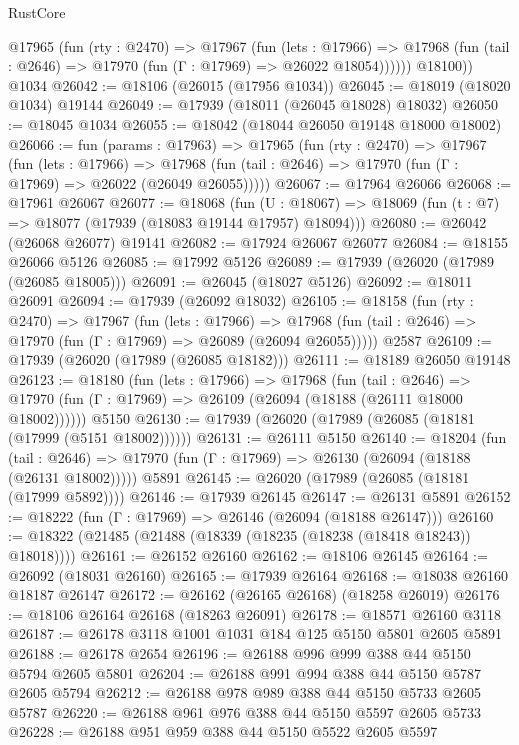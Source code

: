 \begin{lexlean}{RustCore}
\begin{coremodule}
          @17965
            (fun (rty : @2470) =>
            @17967
              (fun (lets : @17966) =>
              @17968 (fun (tail : @2646) => @17970 (fun (Γ : @17969) => @26022 @18054))))))
        @18100))
    @1034
@26042 := @18106 (@26015 (@17956 @1034))
@26045 := @18019 (@18020 @1034) @19144
@26049 := @17939 (@18011 (@26045 @18028) @18032)
@26050 := @18045 @1034
@26055 := @18042 (@18044 @26050 @19148 @18000 @18002)
@26066 := fun (params : @17963) =>
  @17965
    (fun (rty : @2470) =>
    @17967
      (fun (lets : @17966) =>
      @17968 (fun (tail : @2646) => @17970 (fun (Γ : @17969) => @26022 (@26049 @26055)))))
@26067 := @17964 @26066
@26068 := @17961 @26067
@26077 := @18068
    (fun (U : @18067) => @18069 (fun (t : @7) => @18077 (@17939 (@18083 @19144 @17957) @18094)))
@26080 := @26042 (@26068 @26077) @19141
@26082 := @17924 @26067 @26077
@26084 := @18155 @26066 @5126
@26085 := @17992 @5126
@26089 := @17939 (@26020 (@17989 (@26085 @18005)))
@26091 := @26045 (@18027 @5126)
@26092 := @18011 @26091
@26094 := @17939 (@26092 @18032)
@26105 := @18158
    (fun (rty : @2470) =>
    @17967
      (fun (lets : @17966) =>
      @17968 (fun (tail : @2646) => @17970 (fun (Γ : @17969) => @26089 (@26094 @26055)))))
    @2587
@26109 := @17939 (@26020 (@17989 (@26085 @18182)))
@26111 := @18189 @26050 @19148
@26123 := @18180
    (fun (lets : @17966) =>
    @17968
      (fun (tail : @2646) =>
      @17970 (fun (Γ : @17969) => @26109 (@26094 (@18188 (@26111 @18000 @18002))))))
    @5150
@26130 := @17939 (@26020 (@17989 (@26085 (@18181 (@17999 (@5151 @18002))))))
@26131 := @26111 @5150
@26140 := @18204
    (fun (tail : @2646) => @17970 (fun (Γ : @17969) => @26130 (@26094 (@18188 (@26131 @18002)))))
    @5891
@26145 := @26020 (@17989 (@26085 (@18181 (@17999 @5892))))
@26146 := @17939 @26145
@26147 := @26131 @5891
@26152 := @18222 (fun (Γ : @17969) => @26146 (@26094 (@18188 @26147)))
@26160 := @18322 (@21485 (@21488 (@18339 (@18235 (@18238 (@18418 @18243)) @18018))))
@26161 := @26152 @26160
@26162 := @18106 @26145
@26164 := @26092 (@18031 @26160)
@26165 := @17939 @26164
@26168 := @18038 @26160 @18187 @26147
@26172 := @26162 (@26165 @26168) (@18258 @26019)
@26176 := @18106 @26164 @26168 (@18263 @26091)
@26178 := @18571 @26160 @3118
@26187 := @26178 @3118 @1001 @1031 @184 @125 @5150 @5801 @2605 @5891
@26188 := @26178 @2654
@26196 := @26188 @996 @999 @388 @44 @5150 @5794 @2605 @5801
@26204 := @26188 @991 @994 @388 @44 @5150 @5787 @2605 @5794
@26212 := @26188 @978 @989 @388 @44 @5150 @5733 @2605 @5787
@26220 := @26188 @961 @976 @388 @44 @5150 @5597 @2605 @5733
@26228 := @26188 @951 @959 @388 @44 @5150 @5522 @2605 @5597

\end{coremodule}
\end{lexlean}
